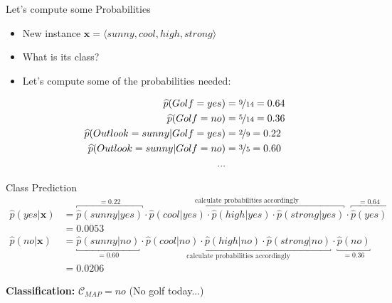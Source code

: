 \begin{frame}{Let's compute some Probabilities}{}
	\begin{itemize}
		\item New instance $\bm{x} = \langle sunny, cool, high, strong \rangle$
		\item What is its class?
		\item Let's compute some of the probabilities needed:
	\end{itemize}
	
	\begin{align*}
		\widehat{p}(Golf = yes) 						&= \nicefrac{9}{14} = 0.64 	\\
		\widehat{p}(Golf = no)						&= \nicefrac{5}{14} = 0.36 	\\
		\widehat{p}(Outlook = sunny \vert Golf = yes) 	&= \nicefrac{2}{9} = 0.22 	\\
		\widehat{p}(Outlook = sunny \vert Golf = no) 	&= \nicefrac{3}{5} = 0.60 	\\
		...
	\end{align*}
\end{frame}


\begin{frame}{Class Prediction}{}
	\vspace*{-10mm}
	\begin{align*}
		\widehat{p}(yes \vert \bm{x}) &= \overbracket{
			\widehat{p}(sunny \vert yes)
		}^{=0.22} \cdot
		\overbracket{
			\widehat{p}(cool \vert yes) \cdot \widehat{p}(high \vert yes) \cdot \widehat{p}(strong \vert yes)
		}^{\text{calculate probabilities accordingly}} \cdot
		\overbracket{
			\widehat{p}(yes)
		}^{=0.64} \\ &= \bm{0.0053}
		\\[2mm]
		\widehat{p}(no \vert \bm{x}) &= \underbracket{
			\widehat{p}(sunny \vert no)
		}_{=0.60} \cdot
		\underbracket{
			\widehat{p}(cool \vert no) \cdot \widehat{p}(high \vert no) \cdot \widehat{p}(strong \vert no)
		}_{\text{calculate probabilities accordingly}} \cdot
		\underbracket{
			\widehat{p}(no)
		}_{=0.36} \\ &= \bm{0.0206}
	\end{align*}

	\begin{boxBlueNoFrame}
		\textbf{Classification:} $\mathcal{C}_{MAP} = no$ (No golf today...)
	\end{boxBlueNoFrame}
\end{frame}


